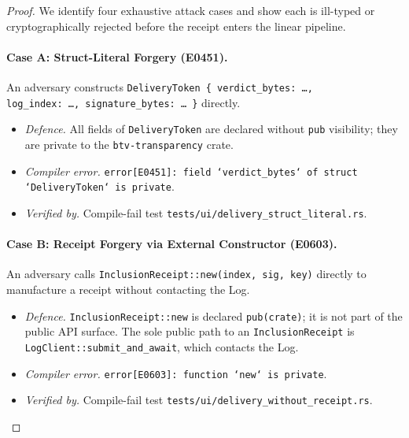 \begin{proof}
We identify four exhaustive attack cases and show each is
ill-typed or cryptographically rejected before the receipt enters
the linear pipeline.

\paragraph{Case A: Struct-Literal Forgery (E0451).}
An adversary constructs \texttt{DeliveryToken~\{~verdict\_bytes:~\ldots,
log\_index:~\ldots,~signature\_bytes:~\ldots~\}} directly.
\begin{itemize}
  \item \emph{Defence.} All fields of \texttt{DeliveryToken} are declared
  without \texttt{pub} visibility; they are private to the
  \texttt{btv-transparency} crate.
  \item \emph{Compiler error.} \texttt{error[E0451]: field
  `verdict\_bytes` of struct `DeliveryToken` is private}.
  \item \emph{Verified by.} Compile-fail test
  \texttt{tests/ui/delivery\_struct\_literal.rs}.
\end{itemize}

\paragraph{Case B: Receipt Forgery via External Constructor (E0603).}
An adversary calls \texttt{InclusionReceipt::new(index,~sig,~key)}
directly to manufacture a receipt without contacting the Log.
\begin{itemize}
  \item \emph{Defence.} \texttt{InclusionReceipt::new} is declared
  \texttt{pub(crate)}; it is not part of the public API surface.
  The sole public path to an \texttt{InclusionReceipt} is
  \texttt{LogClient::submit\_and\_await}, which contacts the Log.
  \item \emph{Compiler error.} \texttt{error[E0603]: function
  `new` is private}.
  \item \emph{Verified by.} Compile-fail test
  \texttt{tests/ui/delivery\_without\_receipt.rs}.
\end{itemize}


\end{proof}
